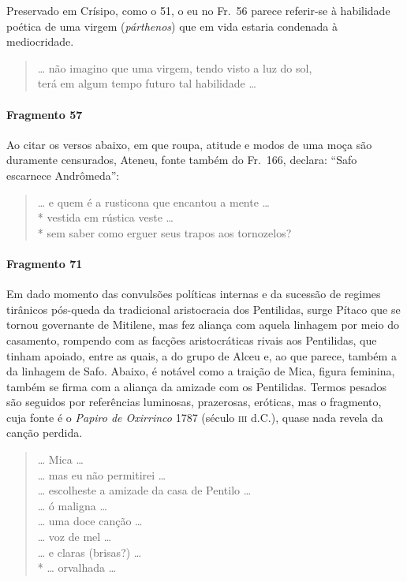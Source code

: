 {\small Preservado em Crísipo, como o 51, o eu no Fr.~56 parece referir-se à habilidade
poética de uma virgem (\textit{párthenos}) que em vida estaria condenada à
mediocridade.}

\begin{verse}
\ldots{} não imagino que uma virgem, tendo visto a luz do sol,\\
terá em algum tempo futuro tal habilidade \ldots{}
\end{verse}

\paragraph{Fragmento 57}

{\small Ao citar os versos abaixo, em que roupa, atitude e modos de uma moça são
duramente censurados, Ateneu, fonte também do Fr.~166, declara: ``Safo
escarnece Andrômeda”:}

\begin{verse}
\ldots{} e quem é a rusticona que encantou a mente \ldots{}\\*
vestida em rústica veste \ldots{}\\*
sem saber como erguer seus trapos aos tornozelos?
\end{verse}

\paragraph{Fragmento 71}

{\small Em dado momento das convulsões políticas internas e da sucessão de regimes
tirânicos pós-queda da tradicional aristocracia dos Pentilidas, surge Pítaco que se tornou governante de
Mitilene, mas fez aliança com aquela linhagem por meio do casamento,
rompendo com as facções aristocráticas rivais aos Pentilidas, que tinham apoiado, entre as quais, a
do grupo de Alceu e, ao que parece, também a da linhagem de Safo. Abaixo, é notável como a traição de 
Mica, figura feminina, também se firma com a aliança da amizade com os Pentilidas. Termos
pesados são seguidos por referências luminosas, prazerosas, eróticas, mas o
fragmento, cuja fonte é o \textit{Papiro de Oxirrinco }1787 (século \textsc{iii} d.C.),
quase nada revela da canção perdida.}

\begin{verse}
\ldots{} Mica \ldots{}\\
\ldots{} mas eu não permitirei \ldots{}\\
\ldots{} escolheste a amizade da casa de Pentilo \ldots{}\\
\ldots{} ó maligna \ldots{}\\
\ldots{} uma doce canção \ldots{}\\
\ldots{} voz de mel \ldots{}\\
\ldots{} e claras (brisas?) \ldots{}\\*
\ldots{} orvalhada \ldots{}
\end{verse}

